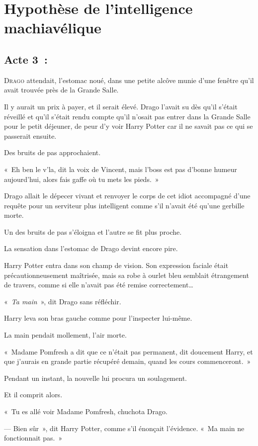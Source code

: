\chapter{Hypothèse de l'intelligence machiavélique}

\section{Acte 3~:}

\lettrine{D}{rago} attendait, l'estomac noué, dans une petite alcôve munie d'une fenêtre qu'il avait trouvée près de la Grande Salle.

Il y aurait un prix à payer, et il serait élevé.
Drago l'avait su dès qu'il s'était réveillé et qu'il s'était rendu compte qu'il n'osait pas entrer dans la Grande Salle pour le petit déjeuner, de peur d'y voir Harry Potter car il ne savait pas ce qui se passerait ensuite.

Des bruits de pas approchaient.

«~Eh ben le v'la, dit la voix de Vincent, mais l'boss est pas d'bonne humeur aujourd'hui, alors fais gaffe où tu mets les pieds.~»

Drago allait le dépecer vivant et renvoyer le corps de cet idiot accompagné d'une requête pour un serviteur plus intelligent comme s'il n'avait été qu'une gerbille morte.

Un des bruits de pas s'éloigna et l'autre se fit plus proche.

La sensation dans l'estomac de Drago devint encore pire.

Harry Potter entra dans son champ de vision.
Son expression faciale était précautionneusement maîtrisée, mais sa robe à ourlet bleu semblait étrangement de travers, comme si elle n'avait pas été remise correctement…

«~\emph{Ta main}~», dit Drago sans réfléchir.

Harry leva son bras gauche comme pour l'inspecter lui-même.

La main pendait mollement, l'air morte.

«~Madame Pomfresh a dit que ce n'était pas permanent, dit doucement Harry, et que j'aurais en grande partie récupéré demain, quand les cours commenceront.~»

Pendant un instant, la nouvelle lui procura un soulagement.

Et il comprit alors.

«~Tu es allé voir Madame Pomfresh, chuchota Drago.

--- Bien sûr~», dit Harry Potter, comme s'il énonçait l'évidence.
«~Ma main ne fonctionnait pas.~»

